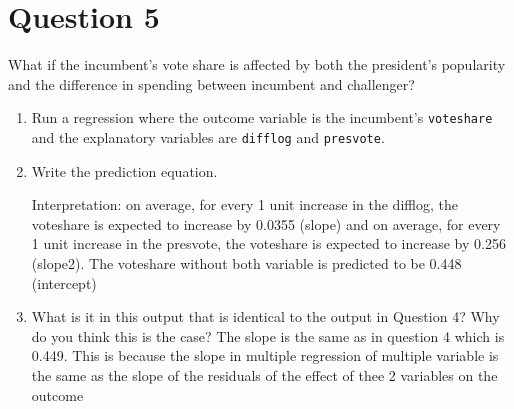 \documentclass[12pt,letterpaper]{article}
\begin{document}
	\newpage	

\section*{Question 5}
\noindent What if the incumbent's vote share is affected by both the president's popularity and the difference in spending between incumbent and challenger? 
	\begin{enumerate}
		\item Run a regression where the outcome variable is the incumbent's \texttt{voteshare} and the explanatory variables are \texttt{difflog} and \texttt{presvote}.
		
		\item Write the prediction equation.	
		
		\noindent Interpretation: on average, for every 1 unit increase in the difflog, the  voteshare is expected to increase by 0.0355 (slope) and on average, for every 1 unit increase in the presvote, the  voteshare is expected to increase by 0.256 (slope2). The  voteshare without both variable is predicted to be 0.448 (intercept)
		\item What is it in this output that is identical to the output in Question 4? Why do you think this is the case?
		\noindent The slope is the same as in question 4 which is 0.449. This is because the slope in multiple regression of multiple variable is the same as the slope of the residuals of the effect of thee 2 variables on the outcome
	\end{enumerate}
\end{document}
